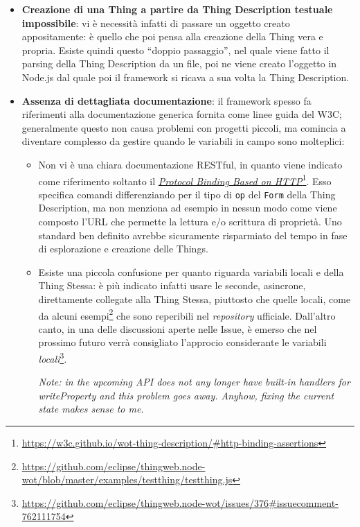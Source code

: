 \documentclass[12pt,a4paper,openright,oneside]{report}
\newcommand{\quotes}[1]{``#1''}
\begin{document}
\begin{itemize}
	\item \textbf{Creazione di una Thing a partire da Thing Description testuale impossibile}: vi è necessità infatti di passare un oggetto creato appositamente: è quello che poi pensa alla creazione della Thing vera e propria. Esiste quindi questo \quotes{doppio passaggio}, nel quale viene fatto il parsing della Thing Description da un file, poi ne viene creato l'oggetto in Node.js dal quale poi il framework si ricava a sua volta la Thing Description.
	
	\item \textbf{Assenza di dettagliata documentazione}: il framework spesso fa riferimenti alla documentazione generica fornita come linee guida del W3C; generalmente questo non causa problemi con progetti piccoli, ma comincia a diventare complesso da gestire quando le variabili in campo sono molteplici:
		\begin{itemize}
			\item Non vi è una chiara documentazione RESTful, in quanto viene indicato come riferimento soltanto il \href{https://w3c.github.io/wot-thing-description/#http-binding-assertions}{\textit{Protocol Binding Based on HTTP}}\footnote{\url{https://w3c.github.io/wot-thing-description/\#http-binding-assertions}}. Esso specifica comandi differenziando per il tipo di \texttt{op} del \texttt{Form} della Thing Description, ma non menziona ad esempio in nessun modo come viene composto l'URL che permette la lettura e/o scrittura di proprietà. Uno standard ben definito avrebbe sicuramente risparmiato del tempo in fase di esplorazione e creazione delle Things.
			
			\item Esiste una piccola confusione per quanto riguarda variabili locali e della Thing Stessa: è più indicato infatti usare le seconde, asincrone, direttamente collegate alla Thing Stessa, piuttosto che quelle locali, come da alcuni esempi\footnote{\url{https://github.com/eclipse/thingweb.node-wot/blob/master/examples/testthing/testthing.js}} che sono reperibili nel \textit{repository} ufficiale. Dall'altro canto, in una delle discussioni aperte nelle Issue, è emerso che nel prossimo futuro verrà consigliato l'approcio considerante le variabili \textit{locali}\footnote{\url{https://github.com/eclipse/thingweb.node-wot/issues/376\#issuecomment-762111754}}.
			
				\textit{Note: in the upcoming API does not any longer have built-in handlers for writeProperty and this problem goes away. Anyhow, fixing the current state makes sense to me.}
			

\end{itemize}
\end{itemize}
\end{document}
